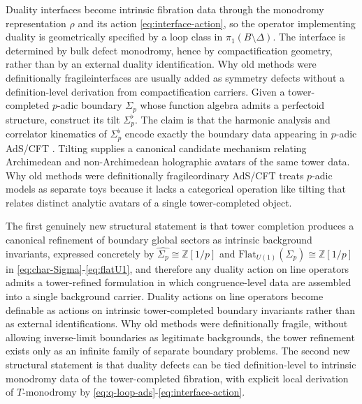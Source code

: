 \documentclass[11pt]{article}
\theoremstyle{remark}
\newcommand{\Z}{\mathbb{Z}}
\begin{document}
Duality interfaces become intrinsic fibration data through the monodromy representation \(\rho\) and its action \eqref{eq:interface-action}, so the operator implementing duality is geometrically specified by a loop class in \(\pi_{1}(B\setminus\Delta)\). The interface is determined by bulk defect monodromy, hence by compactification geometry, rather than by an external duality identification. Why old methods were definitionally fragile\:interfaces are usually added as symmetry defects without a definition-level derivation from compactification carriers. Given a tower-completed \(p\)-adic boundary \(\Sigma_{p}\) whose function algebra admits a perfectoid structure, construct its tilt \(\Sigma_{p}^{\flat}\). The claim is that the harmonic analysis and correlator kinematics of \(\Sigma_{p}^{\flat}\) encode exactly the boundary data appearing in \(p\)-adic AdS/CFT \cite{Gubser2017,Heydeman2018}.
 Tilting supplies a canonical candidate mechanism relating Archimedean and non-Archimedean holographic avatars of the same tower data. Why old methods were definitionally fragile\:ordinary AdS/CFT treats \(p\)-adic models as separate toys because it lacks a categorical operation like tilting that relates distinct analytic avatars of a single tower-completed object.

The first genuinely new structural statement is that tower completion produces a canonical refinement of boundary global sectors as intrinsic background invariants, expressed concretely by \(\widehat{\Sigma_{p}}\cong \Z[1/p]\) and \(\mathrm{Flat}_{U(1)}(\Sigma_{p})\cong \Z[1/p]\) in \eqref{eq:char-Sigma}-\eqref{eq:flatU1}, and therefore any duality action on line operators admits a tower-refined formulation in which congruence-level data are assembled into a single background carrier. Duality actions on line operators become definable as actions on intrinsic tower-completed boundary invariants rather than as external identifications. Why old methods were definitionally fragile, without allowing inverse-limit boundaries as legitimate backgrounds, the tower refinement exists only as an infinite family of separate boundary problems. The second new structural statement is that duality defects can be tied definition-level to intrinsic monodromy data of the tower-completed fibration, with explicit local derivation of \(T\)-monodromy by \eqref{eq:q-loop-ads}-\eqref{eq:interface-action}.
\end{document}
